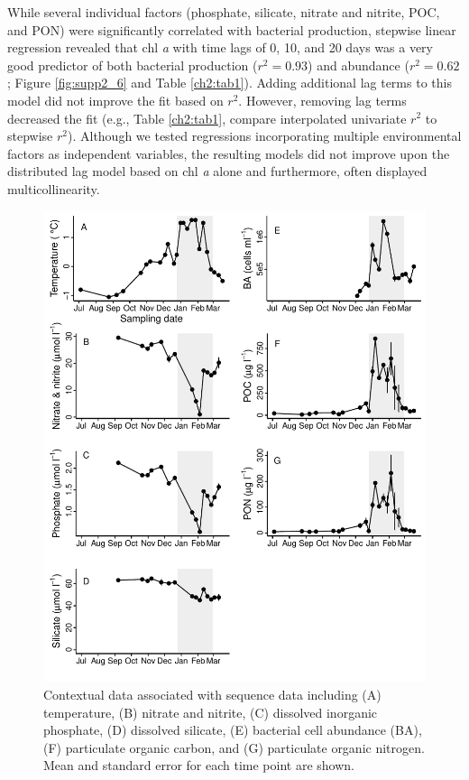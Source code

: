 While several individual factors (phosphate, silicate, nitrate and nitrite, POC, and PON) were significantly correlated with bacterial production, stepwise linear regression revealed that chl \emph{a} with time lags of 0, 10, and 20 days was a very good predictor of both bacterial production ($r^2 = 0.93$) and abundance ($r^2 = 0.62$; Figure \ref{fig:supp2_6} and Table \ref{ch2:tab1}). Adding additional lag terms to this model did not improve the fit based on $r^2$. However, removing lag terms decreased the fit (e.g., Table \ref{ch2:tab1}, compare interpolated univariate $r^2$ to stepwise $r^2$). Although we tested regressions incorporating multiple environmental factors as independent variables, the resulting models did not improve upon the distributed lag model based on chl \emph{a} alone and furthermore, often displayed multicollinearity. 

\begin{figure}[ht!] 
\centering 
\includegraphics[width=\textwidth]{Chapter_3_SWI/Figures/Supplemental_Figure_2_ancillary_data_noDOC} 
\caption[Contextual data for bacterial community composition time series.]{Contextual data associated with sequence data including (A) temperature, (B) nitrate and nitrite, (C) dissolved inorganic phosphate, (D) dissolved silicate, (E) bacterial cell abundance (BA), (F) particulate organic carbon, and (G) particulate organic nitrogen. Mean and standard error for each time point are shown.} 
\label{fig:ch2:supp2_4} 
\end{figure}

